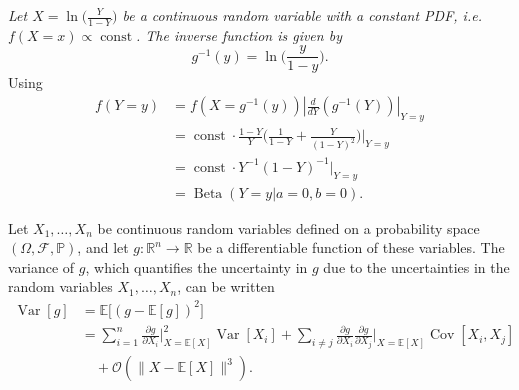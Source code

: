 \begin{example}
	\emph{Let $X = \ln\big(\frac{Y}{1-Y}\big)$ be a continuous random variable with a constant PDF, i.e. $f(X=x)\propto \operatorname{const}$. The inverse function is given by}
	\begin{equation}
		g^{-1}(y) = \ln\bigg(\frac{y}{1-y}\bigg).
	\end{equation}
	Using 
	\begin{equation}
		\begin{split}
			f(Y=y) &= f\left( X = g^{-1}(y) \right) \left| \frac{d}{d Y} \left( g^{-1}(Y) \right) \right|_{Y=y}\\
			& = \operatorname{const}\cdot \frac{1-Y}{Y}\bigg(\frac{1}{1-Y}+\frac{Y}{(1-Y)^2}\bigg)\bigg|_{Y=y}\\
			&=\operatorname{const}\cdot Y^{-1}(1-Y)^{-1}|_{Y=y}\\
			&=\operatorname{Beta}(Y=y|a=0,b=0).
		\end{split}
	\end{equation}
\end{example}

\begin{definition}
	\label{def:error_propagation}
	Let $X_1, \dots, X_n$ be continuous random variables defined on a probability space $(\Omega, \mathcal{F}, \mathbb{P})$, and let 
	$g:\mathbb{R}^n \to \mathbb{R}$ be a differentiable function of these variables. The variance of $g$, which quantifies the uncertainty in $g$ due to the uncertainties in the random variables $X_1, \dots, X_n$, can be written
	\begin{equation}
		\begin{split}
			\operatorname{Var}[g] &= \mathbb{E}\big[(g - \mathbb{E}[g])^2\big] \\
			&= \sum_{i=1}^n  \frac{\partial g}{\partial X_i}\bigg|_{X = \mathbb{E}[X]}^2\operatorname{Var}[X_i] + \sum_{i \neq j} \frac{\partial g}{\partial X_i} \frac{\partial g}{\partial X_j}\bigg|_{X=\mathbb{E}[X]} \operatorname{Cov}[X_i, X_j]\\
			&\quad + \mathcal{O}(\|X - \mathbb{E}[X]\|^3).
		\end{split}
		\label{eq:var_approx}
	\end{equation}
\end{definition}


